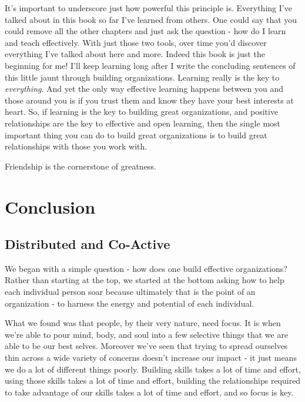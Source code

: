 \documentclass[11pt]{book}
\begin{document}
It's important to underscore just how powerful this principle is. Everything I've talked about in this book so far I've learned from others. One could say that you could remove all the other chapters and just ask the question - how do I learn and teach effectively. With just those two tools, over time you'd discover everything I've talked about here and more. Indeed this book is just the beginning for me! I'll keep learning long after I write the concluding sentences of this little jaunt through building organizations. Learning really is the key to \textit{everything}. And yet the only way effective learning happens between you and those around you is if you trust them and know they have your best interests at heart. So, if learning is the key to building great organizations, and positive relationships are the key to effective and open learning, then the single most important thing you can do to build great organizations is to build great relationships with those you work with.
\newline

Friendship is the cornerstone of greatness.

\part{Conclusion}

\chapter{Distributed and Co-Active}
We began with a simple question - how does one build effective organizations? Rather than starting at the top, we started at the bottom asking how to help each individual person soar because ultimately that is the point of an organization - to harness the energy and potential of each individual. 
\newline

What we found was that people, by their very nature, need focus. It is when we're able to pour mind, body, and soul into a few selective things that we are able to be our best selves. Moreover we've seen that trying to spread ourselves thin across a wide variety of concerns doesn't increase our impact - it just means we do a lot of different things poorly. Building skills takes a lot of time and effort, using those skills takes a lot of time and effort, building the relationships required to take advantage of our skills takes a lot of time and effort, and so focus is key.
\newline
\end{document}
